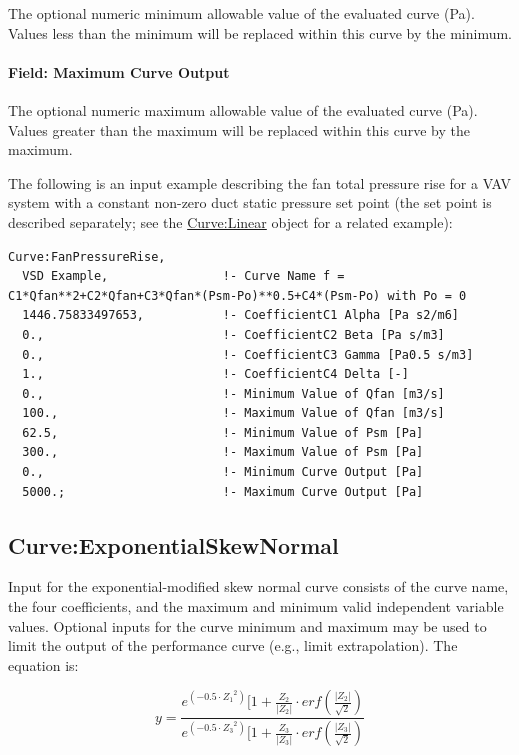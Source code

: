 The optional numeric minimum allowable value of the evaluated curve (Pa). Values less than the minimum will be replaced within this curve by the minimum.

\paragraph{Field: Maximum Curve Output}\label{field-maximum-curve-output-10}

The optional numeric maximum allowable value of the evaluated curve (Pa). Values greater than the maximum will be replaced within this curve by the maximum.

The following is an input example describing the fan total pressure rise for a VAV system with a constant non-zero duct static pressure set point (the set point is described separately; see the \hyperref[curvelinear]{Curve:Linear} object for a related example):

\begin{lstlisting}
Curve:FanPressureRise,
  VSD Example,                !- Curve Name f = C1*Qfan**2+C2*Qfan+C3*Qfan*(Psm-Po)**0.5+C4*(Psm-Po) with Po = 0
  1446.75833497653,           !- CoefficientC1 Alpha [Pa s2/m6]
  0.,                         !- CoefficientC2 Beta [Pa s/m3]
  0.,                         !- CoefficientC3 Gamma [Pa0.5 s/m3]
  1.,                         !- CoefficientC4 Delta [-]
  0.,                         !- Minimum Value of Qfan [m3/s]
  100.,                       !- Maximum Value of Qfan [m3/s]
  62.5,                       !- Minimum Value of Psm [Pa]
  300.,                       !- Maximum Value of Psm [Pa]
  0.,                         !- Minimum Curve Output [Pa]
  5000.;                      !- Maximum Curve Output [Pa]
\end{lstlisting}

\subsection{Curve:ExponentialSkewNormal}\label{curveexponentialskewnormal}

Input for the exponential-modified skew normal curve consists of the curve name, the four coefficients, and the maximum and minimum valid independent variable values. Optional inputs for the curve minimum and maximum may be used to limit the output of the performance curve (e.g., limit extrapolation). The equation is:

\begin{equation}
    y = \frac{{{e^{( - 0.5 \cdot {Z_1}^2)}}[1 + \frac{{{Z_2}}}{{\left| {{Z_2}} \right|}} \cdot erf\left( {\frac{{\left| {{Z_2}} \right|}}{{\sqrt 2 }}} \right)}}{{{e^{( - 0.5 \cdot {Z_3}^2)}}[1 + \frac{{{Z_3}}}{{\left| {{Z_3}} \right|}} \cdot erf\left( {\frac{{\left| {{Z_3}} \right|}}{{\sqrt 2 }}} \right)}}
\end{equation}


